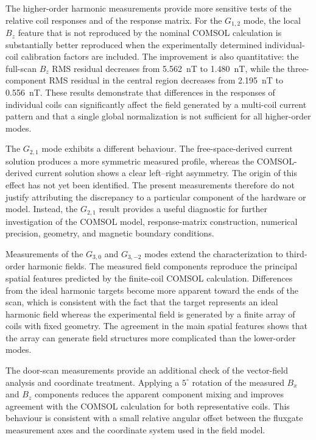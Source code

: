 \documentclass[preprint,12pt]{elsarticle}
\begin{document}
The higher-order harmonic measurements provide more sensitive tests of
the relative coil responses and of the response matrix. For the
$G_{1,2}$ mode, the local $B_z$ feature that is not reproduced by the
nominal COMSOL calculation is substantially better reproduced when the
experimentally determined individual-coil calibration factors are
included. The improvement is also quantitative: the full-scan $B_z$
RMS residual decreases from 5.562~nT to 1.480~nT, while the
three-component RMS residual in the central region decreases from
2.195~nT to 0.556~nT. These results demonstrate that differences in
the responses of individual coils can significantly affect the field
generated by a multi-coil current pattern and that a single global
normalization is not sufficient for all higher-order modes.

The $G_{2,1}$ mode exhibits a different behaviour. The
free-space-derived current solution produces a more symmetric measured
profile, whereas the COMSOL-derived current solution shows a clear
left--right asymmetry. The origin of this effect has not yet been
identified. The present measurements therefore do not justify
attributing the discrepancy to a particular component of the hardware
or model. Instead, the $G_{2,1}$ result provides a useful diagnostic
for further investigation of the COMSOL model, response-matrix
construction, numerical precision, geometry, and magnetic boundary
conditions.

Measurements of the $G_{3,0}$ and $G_{3,-2}$ modes extend the
characterization to third-order harmonic fields. The measured field
components reproduce the principal spatial features predicted by the
finite-coil COMSOL calculation. Differences from the ideal harmonic
targets become more apparent toward the ends of the scan, which is
consistent with the fact that the target represents an ideal harmonic
field whereas the experimental field is generated by a finite array of
coils with fixed geometry. The agreement in the main spatial features
shows that the array can generate field structures more complicated
than the lower-order modes.

The door-scan measurements provide an additional check of the
vector-field analysis and coordinate treatment. Applying a
$5^\circ$ rotation of the measured $B_x$ and $B_z$ components reduces
the apparent component mixing and improves agreement with the COMSOL
calculation for both representative coils. This behaviour is
consistent with a small relative angular offset between the fluxgate
measurement axes and the coordinate system used in the field model.
\end{document}
